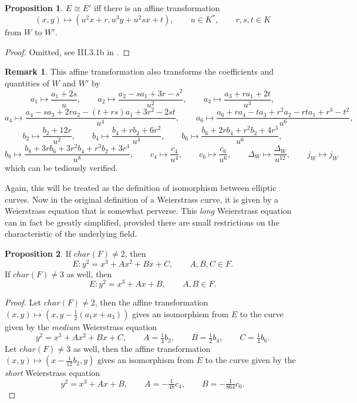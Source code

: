 \documentclass{article}
\newcommand{\rb}[1]{\left( #1 \right)}
\theoremstyle{definition}\newtheorem*{definition}{Definition}
\theoremstyle{definition}\newtheorem*{example}{Example}
\theoremstyle{definition}\newtheorem*{remark}{Remark}
\newtheorem{proposition}{Proposition}[subsection]
\begin{document}
\begin{proposition}
\label{prop:affine}
$ E \cong E' $ iff there is an affine transformation
$$ \rb{x, y} \mapsto \rb{u^2x + r, u^3y + u^2sx + t}, \qquad u \in K^*, \qquad r, s, t \in K $$
from $ W $ to $ W' $.
\end{proposition}

\begin{proof}
Omitted, see III.3.1b in \cite{gtm}.
\end{proof}

\begin{remark}
This affine transformation also transforms the coefficients and quantities of $ W $ and $ W' $ by
$$ a_1 \mapsto \dfrac{a_1 + 2s}{u}, \qquad a_2 \mapsto \dfrac{a_2 - sa_1 + 3r - s^2}{u^2}, \qquad a_3 \mapsto \dfrac{a_3 + ra_1 + 2t}{u^3}, $$
$$ a_4 \mapsto \dfrac{a_4 - sa_3 + 2ra_2 - \rb{t + rs}a_1 + 3r^2 - 2st}{u^4}, \qquad a_6 \mapsto \dfrac{a_6 + ra_4 - ta_3 + r^2a_2 - rta_1 + r^3 - t^2}{u^6}, $$
$$ b_2 \mapsto \dfrac{b_2 + 12r}{u^2}, \qquad b_4 \mapsto \dfrac{b_4 + rb_2 + 6r^2}{u^4}, \qquad b_6 \mapsto \dfrac{b_6 + 2rb_4 + r^2b_2 + 4r^3}{u^6}, $$
$$ b_8 \mapsto \dfrac{b_8 + 3rb_6 + 3r^2b_4 + r^3b_2 + 3r^4}{u^8}, \qquad c_4 \mapsto \dfrac{c_4}{u^4}, \qquad c_6 \mapsto \dfrac{c_6}{u^6}, \qquad \Delta_W \mapsto \dfrac{\Delta_W}{u^12}, \qquad j_W \mapsto j_W $$
which can be tediously verified.
\end{remark}

Again, this will be treated as the definition of isomorphism between elliptic curves. Now in the original definition of a Weierstrass curve, it is given by a Weierstrass equation that is somewhat perverse. This \emph{long} Weierstrass equation can in fact be greatly simplified, provided there are small restrictions on the characteristic of the underlying field.

\begin{proposition}
If $ char\rb{F} \ne 2 $, then
$$ E : y^2 = x^3 + Ax^2 + Bx + C, \qquad A, B, C \in F. $$
If $ char\rb{F} \ne 3 $ as well, then
$$ E : y^2 = x^3 + Ax + B, \qquad A, B \in F. $$
\end{proposition}

\begin{proof}
Let $ char\rb{F} \ne 2 $, then the affine transformation $ \rb{x, y} \mapsto \rb{x, y - \tfrac{1}{2}\rb{a_1x + a_3}} $ gives an isomorphism from $ E $ to the curve given by the \emph{medium} Weierstrass equation
$$ y^2 = x^3 + Ax^2 + Bx + C, \qquad A = \tfrac{1}{4}b_2, \qquad B = \tfrac{1}{2}b_4, \qquad C = \tfrac{1}{4}b_6. $$
Let $ char\rb{F} \ne 3 $ as well, then the affine transformation $ \rb{x, y} \mapsto \rb{x - \tfrac{1}{12}b_2, y} $ gives an isomorphism from $ E $ to the curve given by the \emph{short} Weierstrass equation
$$ y^2 = x^3 + Ax + B, \qquad A = -\tfrac{1}{48}c_4, \qquad B = -\tfrac{1}{864}c_6. $$
\end{proof}
\end{document}
